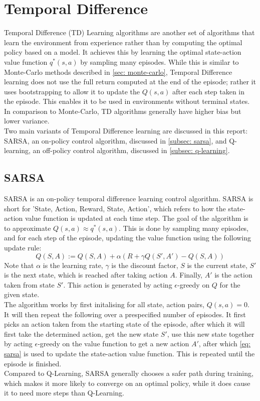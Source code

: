 \documentclass{class}
\begin{document}
\section{Temporal Difference}
\label{sec: temporal difference}
Temporal Difference (TD) Learning algorithms are another set of algorithms that learn the environment from experience rather than by computing the optimal policy based on a model. It achieves this by learning the optimal state-action value function $q^*(s, a)$ by sampling many episodes. While this is similar to Monte-Carlo methods described in \autoref{sec: monte-carlo}, Temporal Difference learning does not use the full return computed at the end of the episode; rather it uses bootstrapping to allow it to update the $Q(s, a)$ after each step taken in the episode. This enables it to be used in environments without terminal states. In comparison to Monte-Carlo, TD algorithms generally have higher bias but lower variance. 
\\[0.3cm]
Two main variants of Temporal Difference learning are discussed in this report: SARSA, an on-policy control algorithm, discussed in \autoref{subsec: sarsa}, and Q-learning, an off-policy control algorithm, discussed in \autoref{subsec: q-learning}. 

\subsection{SARSA}
\label{subsec: sarsa}
SARSA is an on-policy temporal difference learning control algorithm. SARSA is short for 'State, Action, Reward, State, Action', which refers to how the state-action value function is updated at each time step. The goal of the algorithm is to approximate $Q(s,a) \approx q^*(s,a)$. This is done by sampling many episodes, and for each step of the episode, updating the value function using the following update rule:
\begin{equation}
    \label{eq: sarsa}
    Q(S,A) := Q(S,A) + \alpha(R + \gamma Q(S', A') - Q(S, A))
\end{equation}
Note that $\alpha$ is the learning rate, $\gamma$ is the discount factor, $S$ is the current state, $S'$ is the next state, which is reached after taking action $A$. Finally, $A'$ is the action taken from state $S'$. This action is generated by acting $\epsilon$-greedy on $Q$ for the given state. 
\\[0.3cm]
The algorithm works by first initalising for all state, action pairs, $Q(s,a) = 0$. It will then repeat the following over a prespecified number of episodes. It first picks an action taken from the starting state of the episode, after which it will first take the determined action, get the new state $S'$, use this new state together by acting $\epsilon$-greedy on the value function to get a new action $A'$, after which \autoref{eq: sarsa} is used to update the state-action value function. This is repeated until the episode is finished.
\\[0.3cm]
Compared to Q-Learning, SARSA generally chooses a safer path during training, which makes it more likely to converge on an optimal policy, while it does cause it to need more steps than Q-Learning.
\end{document}
